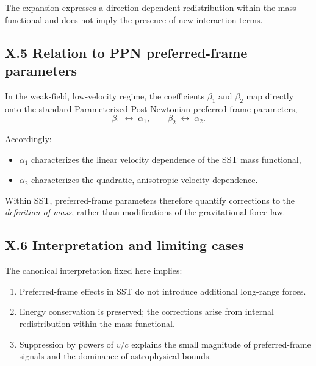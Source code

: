 \documentclass[10pt]{article}
\begin{document}
        The expansion expresses a direction-dependent redistribution within the mass
        functional and does not imply the presence of new interaction terms.

    \subsection*{X.5 Relation to PPN preferred-frame parameters}

        In the weak-field, low-velocity regime, the coefficients $\beta_1$ and $\beta_2$
        map directly onto the standard Parameterized Post-Newtonian preferred-frame
        parameters,
        \begin{equation}
            \beta_1 \;\leftrightarrow\; \alpha_1,
            \qquad
            \beta_2 \;\leftrightarrow\; \alpha_2 .
        \end{equation}

        Accordingly:
        \begin{itemize}
            \item $\alpha_1$ characterizes the linear velocity dependence of the SST mass
            functional,
            \item $\alpha_2$ characterizes the quadratic, anisotropic velocity dependence.
        \end{itemize}

        Within SST, preferred-frame parameters therefore quantify corrections to the
        \emph{definition of mass}, rather than modifications of the gravitational
        force law.

    \subsection*{X.6 Interpretation and limiting cases}

        The canonical interpretation fixed here implies:
        \begin{enumerate}
            \item Preferred-frame effects in SST do not introduce additional long-range
            forces.
            \item Energy conservation is preserved; the corrections arise from internal
            redistribution within the mass functional.
            \item Suppression by powers of $v/c$ explains the small magnitude of
            preferred-frame signals and the dominance of astrophysical bounds.
        \end{enumerate}
\end{document}
